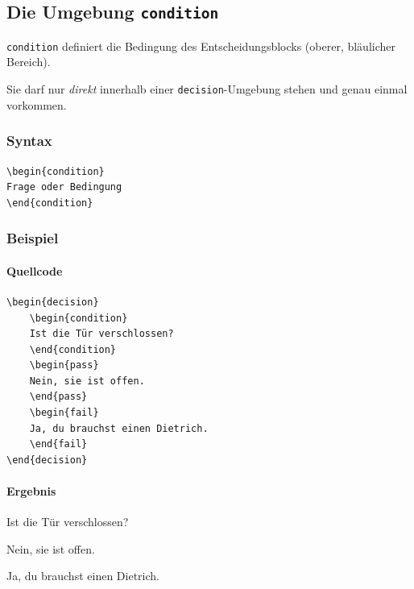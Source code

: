 \subsection{Die Umgebung \texttt{condition}}

\verb|condition| definiert die Bedingung des Entscheidungsblocks
(oberer, bläulicher Bereich).

Sie darf nur \emph{direkt} innerhalb einer \verb|decision|-Umgebung stehen
und genau einmal vorkommen.

\subsubsection*{Syntax}

\begin{Verbatim}
\begin{condition}
Frage oder Bedingung
\end{condition}
\end{Verbatim}

\subsubsection*{Beispiel}

\paragraph{Quellcode}

\begin{Verbatim}
\begin{decision}
    \begin{condition}
    Ist die Tür verschlossen?
    \end{condition}
    \begin{pass}
    Nein, sie ist offen.
    \end{pass}
    \begin{fail}
    Ja, du brauchst einen Dietrich.
    \end{fail}
\end{decision}
\end{Verbatim}

\paragraph{Ergebnis}

\begin{decision}
    \begin{condition}
    Ist die Tür verschlossen?
    \end{condition}
    \begin{pass}
    Nein, sie ist offen.
    \end{pass}
    \begin{fail}
    Ja, du brauchst einen Dietrich.
    \end{fail}
\end{decision}


